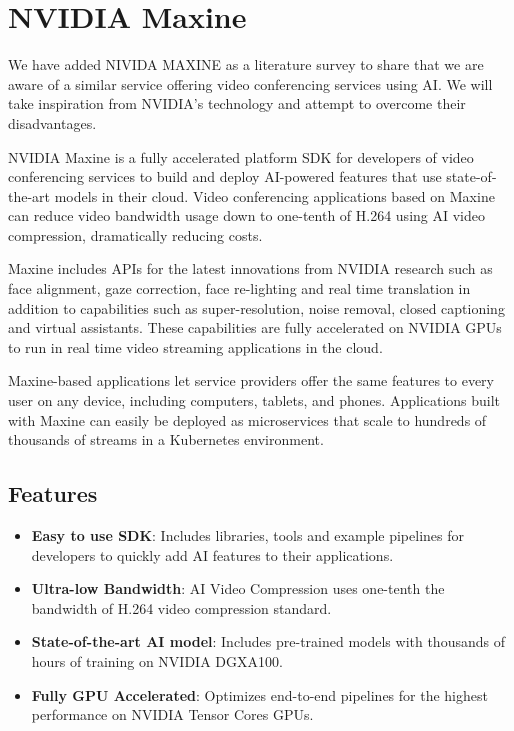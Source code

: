 \section{NVIDIA Maxine}

We have added NIVIDA MAXINE as a literature survey to share that we are aware of 
a similar service offering video conferencing services using AI. We will take 
inspiration from NVIDIA's technology and attempt to overcome their disadvantages.

NVIDIA Maxine is a fully accelerated platform SDK for developers of video 
conferencing services to build and deploy AI-powered features that use state-of-the-art 
models in their cloud. Video conferencing applications based on Maxine can reduce video 
bandwidth usage down to one-tenth of H.264 using AI video compression, dramatically reducing costs.

Maxine includes APIs for the latest innovations from NVIDIA research such as face alignment, 
gaze correction, face re-lighting and real time translation in addition to capabilities such 
as super-resolution, noise removal, closed captioning and virtual assistants. These capabilities are 
fully accelerated on NVIDIA GPUs to run in real time video streaming applications in the cloud.

Maxine-based applications let service providers offer the same features to every user on any device,
including computers, tablets, and phones. Applications built with Maxine can easily be deployed as 
microservices that scale to hundreds of thousands of streams in a Kubernetes environment.~\cite{Maxine}

\subsection{Features}

\begin{itemize}
    \item \textbf{Easy to use SDK}: Includes libraries, tools and example pipelines 
    for developers to quickly add AI features to their applications.
    \item \textbf{Ultra-low Bandwidth}: AI Video Compression uses one-tenth the 
    bandwidth of H.264 video compression standard.
    \item \textbf{State-of-the-art AI model}: Includes pre-trained models with thousands of hours 
    of training on NVIDIA DGX\texttrademark A100.
    \item \textbf{Fully GPU Accelerated}: Optimizes end-to-end pipelines for the highest performance 
    on NVIDIA Tensor Cores GPUs.
\end{itemize}

